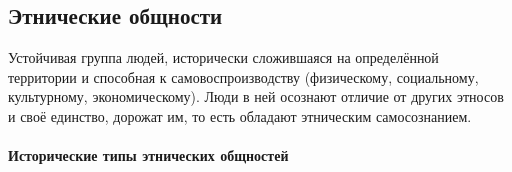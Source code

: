 \documentclass[12pt]{article}
\begin{document}
	\subsection{Этнические общности}

	\begin{definition}
		Устойчивая группа людей, исторически сложившаяся на определённой территории и способная к самовоспроизводству (физическому, социальному, культурному, экономическому). Люди в ней осознают отличие от других этносов и своё единство, дорожат им, то есть обладают этническим самосознанием.
	\end{definition}

	\paragraph{Исторические типы этнических общностей}
\end{document}
